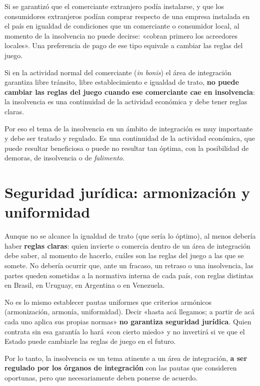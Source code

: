 \documentclass[12pt,oneside]{book}
\begin{document}
Si se garantizó que el comerciante extranjero podía instalarse, y que los consumidores extranjeros podían comprar respecto de una empresa instalada en el país en igualdad de condiciones que un comerciante o consumidor local, al momento de la insolvencia no puede decirse: «cobran primero los acreedores locales». Una preferencia de pago de ese tipo equivale a cambiar las reglas del juego.

\begin{important}
Si en la actividad normal del comerciante (\textit{in bonis}) el área de integración garantiza libre tránsito, libre establecimiento e igualdad de trato, \textbf{no puede cambiar las reglas del juego cuando ese comerciante cae en insolvencia}: la insolvencia es una continuidad de la actividad económica y debe tener reglas claras.
\end{important}

Por eso el tema de la insolvencia en un ámbito de integración es muy importante y debe ser tratado y regulado. Es una continuidad de la actividad económica, que puede resultar beneficiosa o puede no resultar tan óptima, con la posibilidad de demoras, de insolvencia o de \textit{falimento}.

\section{Seguridad jurídica: armonización y uniformidad}

Aunque no se alcance la igualdad de trato (que sería lo óptimo), al menos debería haber \textbf{reglas claras}: quien invierte o comercia dentro de un área de integración debe saber, al momento de hacerlo, cuáles son las reglas del juego a las que se somete. No debería ocurrir que, ante un fracaso, un retraso o una insolvencia, las partes queden sometidas a la normativa interna de cada país, con reglas distintas en Brasil, en Uruguay, en Argentina o en Venezuela.

No es lo mismo establecer pautas uniformes que criterios armónicos (armonización, armonía, uniformidad). Decir «hasta acá llegamos; a partir de acá cada uno aplica sus propias normas» \textbf{no garantiza seguridad jurídica}. Quien contrata sin esa garantía lo hará «con cierto miedo» y no invertirá si ve que el Estado puede cambiarle las reglas de juego en el futuro.

Por lo tanto, la insolvencia es un tema atinente a un área de integración, \textbf{a ser regulado por los órganos de integración} con las pautas que consideren oportunas, pero que necesariamente deben ponerse de acuerdo.
\end{document}
